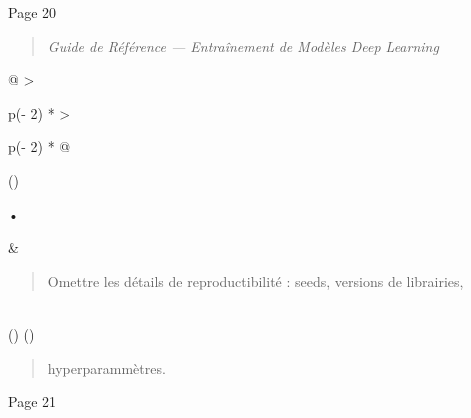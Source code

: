 \documentclass[
]{article}
\begin{document}
Page 20

\begin{quote}
\emph{Guide de Référence --- Entraînement de Modèles Deep Learning}
\end{quote}

\begin{longtable}[]{@{}
  >{\raggedright\arraybackslash}p{(\columnwidth - 2\tabcolsep) * }
  >{\raggedright\arraybackslash}p{(\columnwidth - 2\tabcolsep) * }@{}}
\toprule()
\begin{minipage}[b]{\linewidth}\raggedright
•
\end{minipage} & \begin{minipage}[b]{\linewidth}\raggedright
\begin{quote}
Omettre les détails de reproductibilité : seeds, versions de librairies,
\end{quote}
\end{minipage} \\
\midrule()
\endhead
\bottomrule()
\end{longtable}

\begin{quote}
hyperparammètres.
\end{quote}

Page 21
\end{document}
